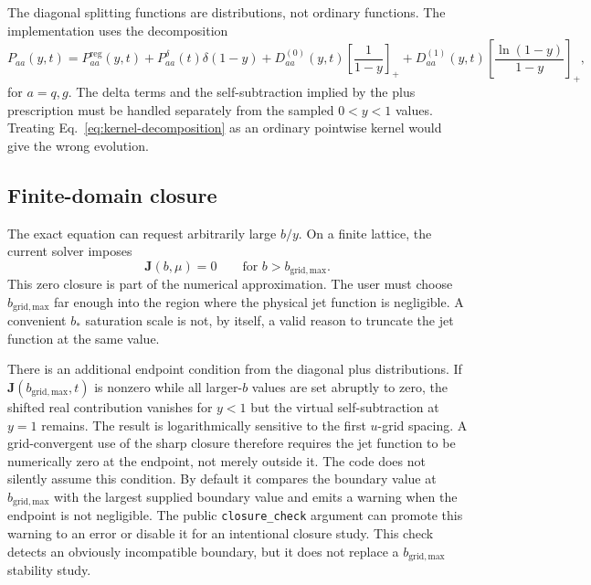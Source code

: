 \documentclass[11pt]{article}
\newcommand{\Jvec}{\bm J}
\begin{document}
The diagonal splitting functions are distributions, not ordinary functions.
The implementation uses the decomposition
\begin{equation}
  P_{aa}(y,t)
  =
  P_{aa}^{\mathrm{reg}}(y,t)
  +P_{aa}^{\delta}(t)\delta(1-y)
  +D_{aa}^{(0)}(y,t)\left[\frac{1}{1-y}\right]_+
  +D_{aa}^{(1)}(y,t)
  \left[\frac{\ln(1-y)}{1-y}\right]_+,
  \label{eq:kernel-decomposition}
\end{equation}
for \(a=q,g\). The delta terms and the self-subtraction implied by the plus
prescription must be handled separately from the sampled \(0<y<1\) values.
Treating Eq.~\eqref{eq:kernel-decomposition} as an ordinary pointwise kernel
would give the wrong evolution.

\subsection{Finite-domain closure}

The exact equation can request arbitrarily large \(b/y\). On a finite lattice,
the current solver imposes
\begin{equation}
  \Jvec(b,\mu)=0
  \qquad
  \text{for }b>b_{\mathrm{grid,max}}.
  \label{eq:zero-closure}
\end{equation}
This zero closure is part of the numerical approximation. The user must
choose \(b_{\mathrm{grid,max}}\) far enough into the region where the physical
jet function is negligible. A convenient \(b_*\) saturation scale is not, by
itself, a valid reason to truncate the jet function at the same value.

There is an additional endpoint condition from the diagonal plus
distributions. If \(\Jvec(b_{\mathrm{grid,max}},t)\) is nonzero while all
larger-\(b\) values are set abruptly to zero, the shifted real contribution
vanishes for \(y<1\) but the virtual self-subtraction at \(y=1\) remains. The
result is logarithmically sensitive to the first \(u\)-grid spacing. A
grid-convergent use of the sharp closure therefore requires the jet function
to be numerically zero at the endpoint, not merely outside it. The code does
not silently assume this condition. By default it compares the boundary value
at \(b_{\mathrm{grid,max}}\) with the largest supplied boundary value and
emits a warning when the endpoint is not negligible. The public
\texttt{closure\_check} argument can promote this warning to an error or
disable it for an intentional closure study. This check detects an obviously
incompatible boundary, but it does not replace a \(b_{\mathrm{grid,max}}\)
stability study.
\end{document}

